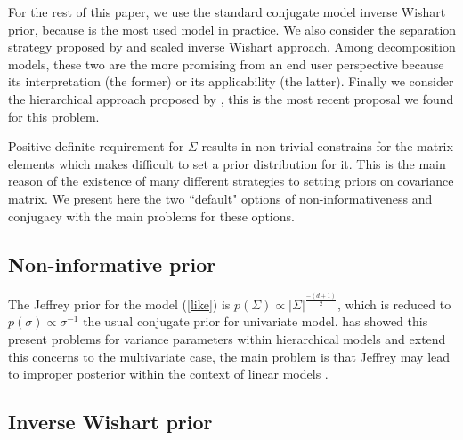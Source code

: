 \documentclass{article}
\begin{document}
For the rest of this paper, we use the standard conjugate model inverse Wishart prior, because is the most used model in practice. We also consider the separation strategy proposed by  \cite{barnard2000} and scaled inverse Wishart approach. Among decomposition models, these two are the more promising from an end user perspective because its interpretation (the former) or its applicability (the latter). Finally we consider the hierarchical approach proposed by \cite{huang2013simple}, this is the most recent proposal we found for this problem. 

Positive definite requirement for $\Sigma$ results in non trivial constrains for the matrix elements which makes difficult to set a prior distribution for it. This is the main reason of the existence of many different strategies to setting priors on covariance matrix.  We present here the two ``default" options of non-informativeness and conjugacy with the main problems for these options. 

\subsection{Non-informative prior} 
The  Jeffrey prior for the model (\ref{like}) is $p(\Sigma)\propto |\Sigma| ^ {\frac{-(d+1)}{2} } $,  which is reduced to $p(\sigma) \propto \sigma^{-1}$  the usual conjugate prior for univariate model.  \cite{gelman2006prior} has showed this present problems for variance parameters within hierarchical models and \cite{SIW2008} extend this concerns to the multivariate case,  the main problem is that Jeffrey may lead to improper posterior within the context of linear models \citep{SIW2008}.  

\subsection{Inverse Wishart prior}
\end{document}
